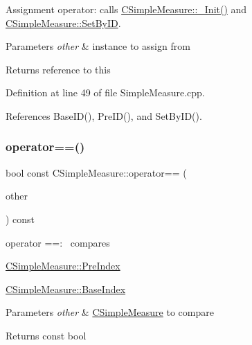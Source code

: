 Assignment operator\+: calls \hyperlink{classCSimpleMeasure_ada8744ac5a824143904a2ecaef2b0b70}{C\+Simple\+Measure\+::\+\_\+\+Init()} and \hyperlink{classCSimpleMeasure_a6945aa333dca5623482d38cd9a7e3225}{C\+Simple\+Measure\+::\+Set\+By\+ID}. 


\begin{DoxyParams}{Parameters}
{\em other} & instance to assign from \\
\hline
\end{DoxyParams}
\begin{DoxyReturn}{Returns}
reference to this 
\end{DoxyReturn}


Definition at line 49 of file Simple\+Measure.\+cpp.



References Base\+I\+D(), Pre\+I\+D(), and Set\+By\+I\+D().

\mbox{\label{classCSimpleMeasure_aafe9d3871eadf4004a62a8561b883b1e}} 
\subsubsection{\texorpdfstring{operator==()}{operator==()}}
{\footnotesize\ttfamily bool const C\+Simple\+Measure\+::operator== (\begin{DoxyParamCaption}\item[{const \hyperlink{classCSimpleMeasure}{C\+Simple\+Measure} \&}]{other }\end{DoxyParamCaption}) const}



operator ==\+:~\newline
 compares 


\begin{DoxyItemize}
\item \hyperlink{classCSimpleMeasure_aa23ed9eec21adb9a97c90a424e7ee18a}{C\+Simple\+Measure\+::\+Pre\+Index}
\item \hyperlink{classCSimpleMeasure_a191dbfa4cc374946bf8a82111f827d92}{C\+Simple\+Measure\+::\+Base\+Index}
\end{DoxyItemize}


\begin{DoxyParams}{Parameters}
{\em other} & \hyperlink{classCSimpleMeasure}{C\+Simple\+Measure} to compare \\
\hline
\end{DoxyParams}
\begin{DoxyReturn}{Returns}
const bool 
\end{DoxyReturn}


